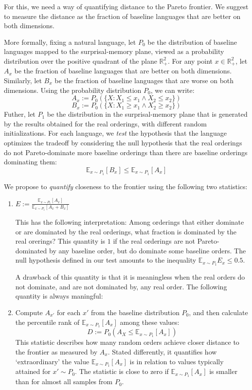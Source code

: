 \documentclass[11pt,letterpaper]{article}
\newcommand{\E}[0]{\mathbb{E}}
\begin{document}
For this, we need a way of quantifying distance to the Pareto frontier.
We suggest to measure the distance as the fraction of baseline languages that are better on both dimensions.

More formally, fixing a natural language, let $P_0$ be the distribution of baseline languages mapped to the surprisal-memory plane, viewed as a probability distribution over the positive quadrant of the plane $\mathbb{R}_+^2$.
For any point $x \in \mathbb{R}_+^2$, let $A_x$ be the fraction of baseline languages that are better on both dimensions.
Similarly, let $B_x$ be the fraction of baseline languages that are worse on both dimensions.
Using the probability distribution $P_0$, we can write:
$$A_x := P_0(\{X : X_1 \leq x_1 \wedge X_2 \leq x_2\})$$
$$B_x := P_0(\{X : X_1 \geq x_1 \wedge X_2 \geq x_2\})$$
Futher, let $P_1$ be the distribution in the surprisal-memory plane that is generated by the results obtained for the real orderings, with different random initializations.
For each language, we \emph{test} the hypothesis that the language optimizes the tradeoff by considering the null hypothesis that the real orderings do not Pareto-dominate more baseline orderings than there are baseline orderings dominating them:
$$\E_{x \sim P_1} [B_x] \leq \E_{x \sim P_1}[A_x]$$

We propose to \emph{quantify} closeness to the frontier using the following two statistics:

\begin{enumerate}
	\item  $E := \frac{\E_{x \sim P_1}[A_x]}{\E_{x \sim P_1}[A_x+B_x]}$

		This has the following interpretation: Among orderings that either dominate or are dominated by the real orderings, what fraction is dominated by the real orerings?
		This quantity is $1$ if the real orderings are not Pareto-dominated by any baseline order, but do dominate some baseline orders.
		The null hypothesis defined in our test amounts to the inequality $\E_{x \sim P_1}E_x \leq 0.5$.

A drawback of this quantity is that it is meaningless when the real orders do not dominate, and are not dominated by, any real order.
The following quantity is always maningful:

	\item Compute $A_{x'}$ for each $x'$ from the baseline distribution $P_0$, and then calculate the percentile rank of $\E_{x \sim P_1}[A_x]$ among these values:
		$$D := P_0(A_X \leq \E_{x \sim P_1}[A_x])$$
This statistic describes how many random orders achieve closer distance to the frontier as measured by $A_x$.
		Stated differently, it quantifies how `extraordinary' the value $\E_{x \sim P_1}[A_x]$ is in relation to values typically attained for $x' \sim P_0$.
The statistic is close to zero if $\E_{x \sim P_1}[A_x]$ is smaller than for almost all samples from $P_0$.

\end{enumerate}
\end{document}
